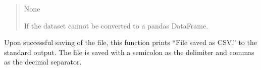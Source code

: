 \documentclass[letterpaper,10pt,english,openany,oneside]{sphinxmanual}
\begin{document}
\begin{fulllineitems}
\begin{quote}
\begin{description}
\begin{itemize}
\end{itemize}

\sphinxAtStartPar
None

\sphinxAtStartPar
{} \textendash{} If the dataset cannot be converted to a pandas DataFrame.

\end{description}\end{quote}

\sphinxAtStartPar
Upon successful saving of the file, this function prints “File saved as CSV.” to the standard output.
The file is saved with a semicolon as the delimiter and commas as the decimal separator.

\end{fulllineitems}



\renewcommand{\indexname}{Python Module Index}
\begin{sphinxtheindex}
\let\bigletter\sphinxstyleindexlettergroup
\bigletter{t}
\item\relax{}
\end{sphinxtheindex}

\renewcommand{\indexname}{Index}
\printindex
\end{document}
